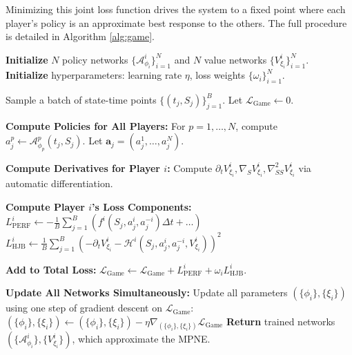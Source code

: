 \documentclass[ecta,draft]{econsocart}
\theoremstyle{plain}
\theoremstyle{remark}
\newcommand{\hamiltonian}{\mathcal{H}}
\begin{document}
Minimizing this joint loss function drives the system to a fixed point where each player's policy is an approximate best response to the others. The full procedure is detailed in Algorithm \ref{alg:game}.

\begin{algorithm}[H]
\caption{NBO Algorithm for N-Player Dynamic Games}
\label{alg:game}
\begin{algorithmic}[1]
\State \textbf{Initialize} $N$ policy networks $\{\mathcal{A}_{\phi_i}^i\}_{i=1}^N$ and $N$ value networks $\{V_{\xi_i}^i\}_{i=1}^N$.
\State \textbf{Initialize} hyperparameters: learning rate $\eta$, loss weights $\{\omega_i\}_{i=1}^N$.

    \State Sample a batch of state-time points $\{(t_j, S_j)\}_{j=1}^B$.
    \State Let $\mathcal{L}_{\text{Game}} \leftarrow 0$.
    
        \State \textbf{Compute Policies for All Players:}
        \State For $p=1,\dots,N$, compute $a_j^p \leftarrow \mathcal{A}_{\phi_p}^p(t_j, S_j)$. Let $\mathbf{a}_j = (a_j^1, \dots, a_j^N)$.
        
        \State \textbf{Compute Derivatives for Player $i$:}
        \State Compute $\partial_t V_{\xi_i}^i, \nabla_S V_{\xi_i}^i, \nabla_{SS}^2 V_{\xi_i}^i$ via automatic differentiation.
        
        \State \textbf{Compute Player $i$'s Loss Components:}
        \State $L_{\text{PERF}}^i \leftarrow -\frac{1}{B}\sum_{j=1}^B \left( f^i(S_j, a_j^i, a_j^{-i}) \Delta t + \dots \right)$
        \State $L_{\text{HJB}}^i \leftarrow \frac{1}{B}\sum_{j=1}^B \left( -\partial_t V_{\xi_i}^i - \hamiltonian^i(S_j, a_j^i, a_j^{-i}, V_{\xi_i}^i) \right)^2$
        
        \State \textbf{Add to Total Loss:} $\mathcal{L}_{\text{Game}} \leftarrow \mathcal{L}_{\text{Game}} + L_{\text{PERF}}^i + \omega_i L_{\text{HJB}}^i$.
    \EndFor
    
    \State \textbf{Update All Networks Simultaneously:}
    \State Update all parameters $(\{\phi_i\}, \{\xi_i\})$ using one step of gradient descent on $\mathcal{L}_{\text{Game}}$:
    \State $(\{\phi_i\}, \{\xi_i\}) \leftarrow (\{\phi_i\}, \{\xi_i\}) - \eta \nabla_{(\{\phi_i\}, \{\xi_i\})} \mathcal{L}_{\text{Game}}$
\EndFor
\State \textbf{Return} trained networks $(\{\mathcal{A}_{\phi_i}^i\}, \{V_{\xi_i}^i\})$, which approximate the MPNE.
\end{algorithmic}
\end{algorithm}
\end{document}
